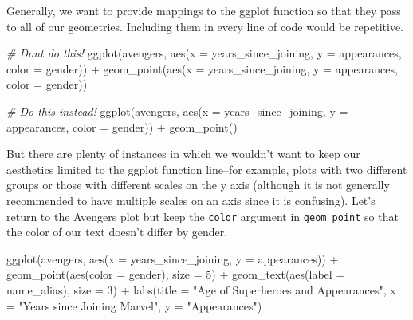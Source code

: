 \documentclass[
]{article}
\newenvironment{Shaded}{\begin{snugshade}}{\end{snugshade}}
\newcommand{\AttributeTok}[1]{\textcolor[rgb]{0.77,0.63,0.00}{#1}}
\newcommand{\CommentTok}[1]{\textcolor[rgb]{0.56,0.35,0.01}{\textit{#1}}}
\newcommand{\DecValTok}[1]{\textcolor[rgb]{0.00,0.00,0.81}{#1}}
\newcommand{\FunctionTok}[1]{\textcolor[rgb]{0.00,0.00,0.00}{#1}}
\newcommand{\NormalTok}[1]{#1}
\newcommand{\SpecialCharTok}[1]{\textcolor[rgb]{0.00,0.00,0.00}{#1}}
\newcommand{\StringTok}[1]{\textcolor[rgb]{0.31,0.60,0.02}{#1}}
\begin{document}
Generally, we want to provide mappings to the ggplot function so that they pass to all of our geometries. Including them in every line of code would be repetitive.

\begin{Shaded}
\begin{Highlighting}[]
\CommentTok{\# Don\textquotesingle{}t do this!}
\FunctionTok{ggplot}\NormalTok{(avengers, }\FunctionTok{aes}\NormalTok{(}\AttributeTok{x =}\NormalTok{ years\_since\_joining,}
                     \AttributeTok{y =}\NormalTok{ appearances,}
                     \AttributeTok{color =}\NormalTok{ gender)) }\SpecialCharTok{+}
  \FunctionTok{geom\_point}\NormalTok{(}\FunctionTok{aes}\NormalTok{(}\AttributeTok{x =}\NormalTok{ years\_since\_joining,}
                 \AttributeTok{y =}\NormalTok{ appearances,}
                 \AttributeTok{color =}\NormalTok{ gender))}

\CommentTok{\# Do this instead!}
\FunctionTok{ggplot}\NormalTok{(avengers, }\FunctionTok{aes}\NormalTok{(}\AttributeTok{x =}\NormalTok{ years\_since\_joining,}
                     \AttributeTok{y =}\NormalTok{ appearances,}
                     \AttributeTok{color =}\NormalTok{ gender)) }\SpecialCharTok{+}
  \FunctionTok{geom\_point}\NormalTok{()}
\end{Highlighting}
\end{Shaded}

But there are plenty of instances in which we wouldn't want to keep our aesthetics limited to the ggplot function line--for example, plots with two different groups or those with different scales on the y axis (although it is not generally recommended to have multiple scales on an axis since it is confusing). Let's return to the Avengers plot but keep the \texttt{color} argument in \texttt{geom\_point} so that the color of our text doesn't differ by gender.

\begin{Shaded}
\begin{Highlighting}[]
\FunctionTok{ggplot}\NormalTok{(avengers, }\FunctionTok{aes}\NormalTok{(}\AttributeTok{x =}\NormalTok{ years\_since\_joining, }\AttributeTok{y =}\NormalTok{ appearances)) }\SpecialCharTok{+}
  \FunctionTok{geom\_point}\NormalTok{(}\FunctionTok{aes}\NormalTok{(}\AttributeTok{color =}\NormalTok{ gender), }\AttributeTok{size =} \DecValTok{5}\NormalTok{) }\SpecialCharTok{+}
  \FunctionTok{geom\_text}\NormalTok{(}\FunctionTok{aes}\NormalTok{(}\AttributeTok{label =}\NormalTok{ name\_alias), }\AttributeTok{size =} \DecValTok{3}\NormalTok{) }\SpecialCharTok{+}
  \FunctionTok{labs}\NormalTok{(}\AttributeTok{title =} \StringTok{"\textquotesingle{}Age\textquotesingle{} of Superheroes and Appearances"}\NormalTok{,}
       \AttributeTok{x =} \StringTok{"Years since Joining Marvel"}\NormalTok{,}
       \AttributeTok{y =} \StringTok{"Appearances"}\NormalTok{)}
\end{Highlighting}
\end{Shaded}
\end{document}
